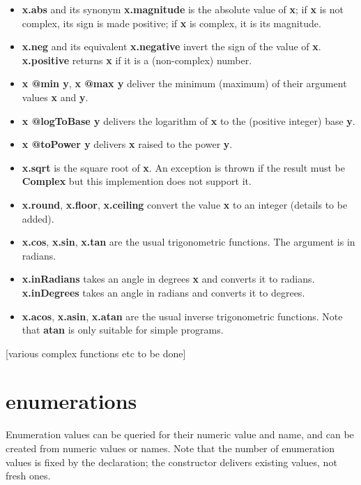 \documentclass{report}
\begin{document}
\begin{itemize}\item {\bf x.abs} and its synonym {\bf x.magnitude} is the absolute value of {\bf x}; if {\bf x} is
not complex, its sign is made positive; if {\bf x} is complex, it is its
magnitude.

\item {\bf x.neg} and its equivalent {\bf x.negative} invert the sign of the value
of {\bf x}. {\bf x.positive} returns {\bf x} if it is a (non-complex) number.

\item {\bf x @min y}, {\bf x @max y} deliver the minimum (maximum) of their argument
values {\bf x} and {\bf y}.

\item {\bf x @logToBase y} delivers the logarithm of {\bf x} to the (positive
integer) base {\bf y}.

\item {\bf x @toPower y} delivers {\bf x} raised to the power {\bf y}.

\item {\bf x.sqrt} is the square root of {\bf x}. An exception is thrown if the result
must be {\bf Complex} but this implemention does not support it.

\item {\bf x.round}, {\bf x.floor}, {\bf x.ceiling} convert the value {\bf x} to an integer
(details to be added).

\item {\bf x.cos}, {\bf x.sin}, {\bf x.tan} are the usual trigonometric functions. The
argument is in radians.

\item {\bf x.inRadians} takes an angle in degrees {\bf x} and converts it to
radians. {\bf x.inDegrees} takes an angle in radians and converts it to
degrees.

\item {\bf x.acos}, {\bf x.asin}, {\bf x.atan} are the usual inverse trigonometric
functions. Note that {\bf atan} is only suitable for simple programs.

\end{itemize}

{[}various complex functions etc to be done{]}

\section{enumerations}


Enumeration values can be queried for their numeric value and name, and can be
created from numeric values or names. Note that the number of enumeration
values is fixed by the declaration; the constructor delivers existing values,
not fresh ones.
\end{document}
